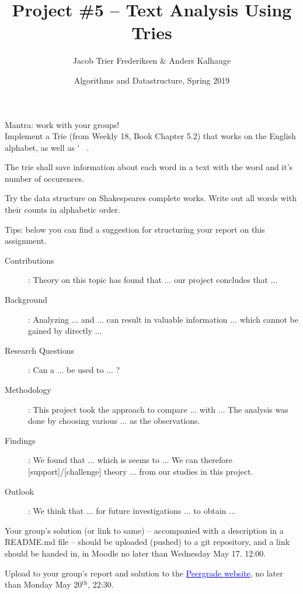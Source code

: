 \documentclass[12pt,a4paper,final]{article}
\title{Project \#5 -- Text Analysis Using Tries}
\author{Jacob Trier Frederiksen \& Anders Kalhauge}
\date{Algorithms and Datastructure, Spring 2019}
\begin{document}
\maketitle

Mantra: work with your groups! \\

Implement a Trie (from Weekly 18, Book Chapter 5.2) that works on the English alphabet, as well as \' ~.

The trie shall save information about each word in a text with the word and it's
number of occurences.

Try the data structure on Shakespeares complete works.
Write out all words with their counts in alphabetic order.

Tips: below you can find a suggestion for structuring your report on this assignment.

\begin{description}
   \item[Contributions]: Theory on this topic has found that ... our project concludes that ... 
   \item[Background]: Analyzing ...  and ...  can result in valuable information ... which cannot be gained by directly ... 
   \item[Research Questions]: Can a ... be used to ... ? 
   \item[Methodology]: This project took the approach to compare ... with ... The analysis was done by choosing various ... as the observations. 
   \item[Findings]: We found that ... which is seems to ... We can therefore [support]/[challenge] theory ... from our studies in this project.
   \item[Outlook]: We think that ... for future investigations ... to obtain ... 
\end{description}

Your group's solution (or link to same) -- accompanied with a description in a README.md file -- should
be uploaded (pushed) to a git repository, and a link should be handed in, in Moodle
no later than Wednesday May 17. 12:00.

Upload to your group's report and solution to the \href{https://www.peergrade.io}{\textcolor{blue}{\underline{Peergrade website}}}, no later than Monday May 20$^\textrm{th}$, 22:30. 
\end{document}
